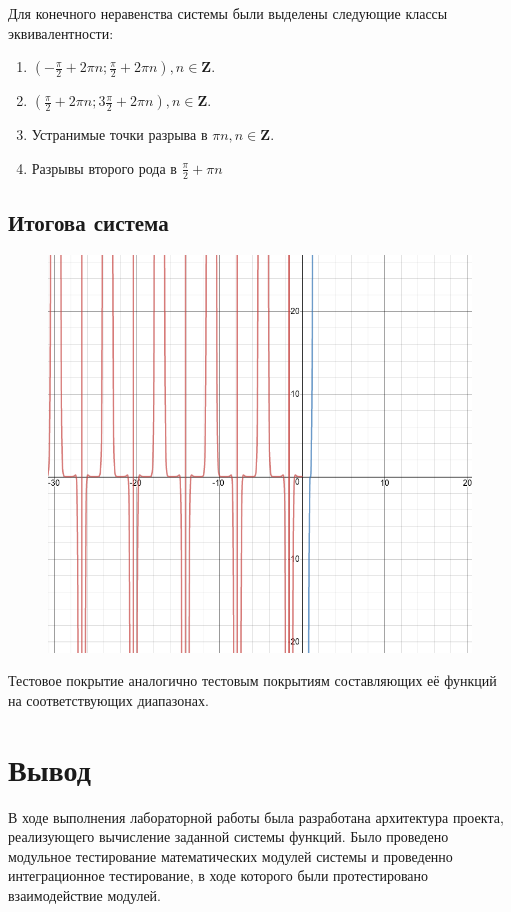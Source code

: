 \documentclass[a4paper,10pt]{article}
\begin{document}
    Для конечного неравенства системы были выделены следующие классы эквивалентности:
    \begin{enumerate}
    	\item $(-\frac \pi 2+2\pi n;\frac \pi 2+2\pi n), n \in \mathbf Z$.
    	\item $(\frac \pi 2+2\pi n;3\frac \pi 2+2\pi n), n \in \mathbf Z$.
    	\item Устранимые точки разрыва в $\pi n, n \in \mathbf Z$.
    	\item Разрывы второго рода в $\frac \pi 2 + \pi n$
    \end{enumerate}
\newpage
	\subsection*{Итогова система}
		\begin{figure}[h!]
			\includegraphics[scale=0.3]{./images/system.png}
		\end{figure}

		Тестовое покрытие аналогично тестовым покрытиям составляющих её функций на соответствующих диапазонах.
\section*{Вывод}
В ходе выполнения лабораторной работы была разработана архитектура проекта, реализующего
вычисление заданной системы функций. Было проведено модульное тестирование математических
модулей системы и проведенно интеграционное тестирование, в ходе которого были протестировано
взаимодействие модулей.
\end{document}
